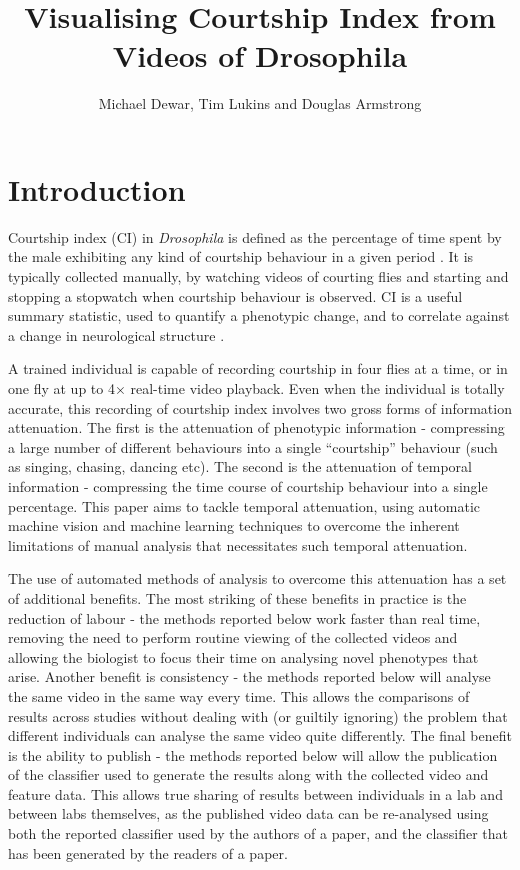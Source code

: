 \documentclass[acmtocl]{acmtrans2m}
\title{Visualising Courtship Index from Videos of Drosophila}
\author{Michael Dewar, Tim Lukins and Douglas Armstrong}
\begin{document}
	
	\maketitle

\section{Introduction}

Courtship index (CI) in \emph{Drosophila} is defined as the percentage of time spent by the male exhibiting any kind of courtship behaviour in a given period \cite{}. It is typically collected manually, by watching videos of courting flies and starting and stopping a stopwatch when courtship behaviour is observed. CI is a useful summary statistic, used to quantify a phenotypic change, and to correlate against a change in neurological structure \cite{}.

A trained individual is capable of recording courtship in four flies at a time, or in one fly at up to 4$\times$ real-time video playback. Even when the individual is totally accurate, this recording of courtship index involves two gross forms of information attenuation. The first is the attenuation of phenotypic information - compressing a large number of different behaviours into a single ``courtship'' behaviour (such as singing, chasing, dancing etc). The second is the attenuation of temporal information - compressing the time course of courtship behaviour into a single percentage. This paper aims to tackle temporal attenuation, using automatic machine vision and machine learning techniques to overcome the inherent limitations of manual analysis that necessitates such temporal attenuation.

The use of automated methods of analysis to overcome this attenuation has a set of additional benefits. The most striking of these benefits in practice is the reduction of labour - the methods reported below work faster than real time, removing the need to perform routine viewing of the collected videos and allowing the biologist to focus their time on analysing novel phenotypes that arise. Another benefit is consistency - the methods reported below will analyse the same video in the same way every time. This allows the comparisons of results across studies without dealing with (or guiltily ignoring) the problem that different individuals can analyse the same video quite differently. The final benefit is the ability to publish - the methods reported below will allow the publication of the classifier used to generate the results along with the collected video and feature data. This allows true sharing of results between individuals in a lab and between labs themselves, as the published video data can be re-analysed using both the reported classifier used by the authors of a paper, and the classifier that has been generated by the readers of a paper.
\end{document}
